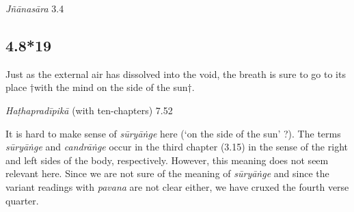 \begin{ekdosis}
\begin{sources}[hp04_008_18]
\emph{Jñānasāra} 3.4
\begin{versinnote}
\end{versinnote}

\end{sources}



\subsection*{4.8*19}
\begin{translation}[hp04_008_19]
Just as the external air has dissolved into the void, the breath is sure to go to its place †with the mind on the side of the sun†.
\end{translation}


\begin{testimonia}[hp04_008_19]
\emph{Haṭhapradīpikā} (with ten-chapters) 7.52 
\begin{versinnote}
\end{versinnote}
\end{testimonia}

\begin{philcomm}[hp04_008_19]
It is hard to make sense of \emph{sūryāṅge} here (`on the side of the sun' ?). The terms \emph{sūryāṅge} and \emph{candrāṅge} occur in the third chapter (3.15) in the sense of the right and left sides of the body, respectively. However, this meaning does not seem relevant here. Since we are not sure of the meaning of \emph{sūryāṅge} and since the variant readings with \emph{pavana} are not clear either, we have cruxed the fourth verse quarter.      
\end{philcomm}


\end{ekdosis}
